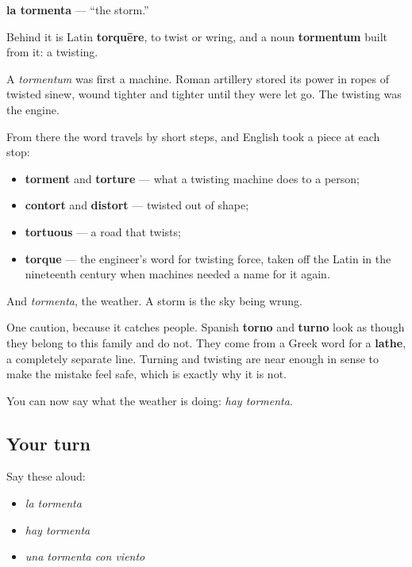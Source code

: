 \begin{cousinweb}
\textbf{la tormenta} — \textquotedblleft{}the storm.\textquotedblright{}

Behind it is Latin \textbf{torquēre}, to twist or wring, and a noun \textbf{tormentum} built from it: a twisting.

A \emph{tormentum} was first a machine. Roman artillery stored its power in ropes of twisted sinew, wound tighter and tighter until they were let go. The twisting was the engine.

From there the word travels by short steps, and English took a piece at each stop:

\begin{itemize}
\raggedright
  \item \textbf{torment} and \textbf{torture} — what a twisting machine does to a person;
  \item \textbf{contort} and \textbf{distort} — twisted out of shape;
  \item \textbf{tortuous} — a road that twists;
  \item \textbf{torque} — the engineer's word for twisting force, taken off the Latin in the nineteenth century when machines needed a name for it again.
\end{itemize}

And \emph{tormenta}, the weather. A storm is the sky being wrung.

One caution, because it catches people. Spanish \textbf{torno} and \textbf{turno} look as though they belong to this family and do not. They come from a Greek word for a \textbf{lathe}, a completely separate line. Turning and twisting are near enough in sense to make the mistake feel safe, which is exactly why it is not.
\end{cousinweb}

\begin{grammarlens}[title={What you've built}]
You can now say what the weather is doing: \emph{hay tormenta}.
\end{grammarlens}

\subsection*{Your turn}
Say these aloud:

\begin{itemize}
\raggedright
  \item \emph{la tormenta}
  \item \emph{hay tormenta}
  \item \emph{una tormenta con viento}
\end{itemize}

